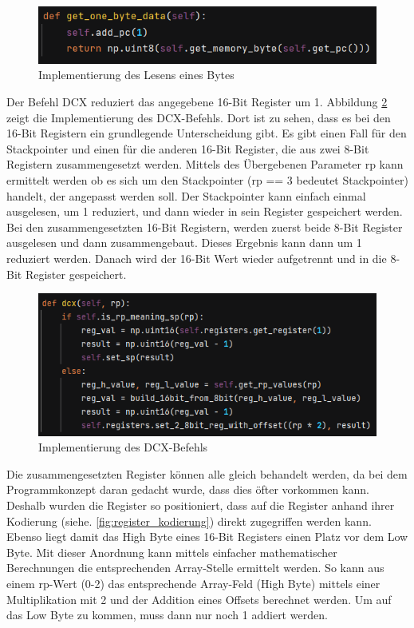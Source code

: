 \documentclass[12pt]{article}
\newcommand{\imgSpaceBefore}{\vspace{10pt}}
\begin{document}
\imgSpaceBefore
\begin{figure}[h]
\centering
\includegraphics[width=15cm]{Bilder/GetOneByteData}
\caption{Implementierung des Lesens eines Bytes}
\label{fig:GetOneByteData}
\end{figure}

\noindent
Der Befehl DCX reduziert das angegebene 16-Bit Register um 1. 
Abbildung \ref{fig:dcx_impl} zeigt die Implementierung des DCX-Befehls. 
Dort ist zu sehen, dass es bei den 16-Bit Registern ein grundlegende Unterscheidung gibt. Es gibt einen Fall für den Stackpointer und einen für die anderen 16-Bit Register, die aus zwei 8-Bit Registern zusammengesetzt werden. Mittels des Übergebenen Parameter rp kann ermittelt werden ob es sich um den Stackpointer (rp  == 3 bedeutet Stackpointer) handelt, der angepasst werden soll. 
Der Stackpointer kann einfach einmal ausgelesen, um 1 reduziert, und dann wieder in sein Register gespeichert werden.
Bei den zusammengesetzten 16-Bit Registern, werden zuerst beide 8-Bit Register ausgelesen und dann zusammengebaut. Dieses Ergebnis kann dann um 1 reduziert werden. Danach wird der 16-Bit Wert wieder aufgetrennt und in die 8-Bit Register gespeichert. 

\imgSpaceBefore
\begin{figure}[H]
\centering
\includegraphics[width=15cm]{Bilder/dcx_impl}
\caption{Implementierung des DCX-Befehls}
\label{fig:dcx_impl}
\end{figure}

\noindent
Die zusammengesetzten Register können alle gleich behandelt werden, da bei dem Programmkonzept daran gedacht wurde, dass dies öfter vorkommen kann. Deshalb wurden die Register so positioniert, dass auf die Register anhand ihrer Kodierung (siehe. \ref{fig:register_kodierung}) direkt zugegriffen werden kann. Ebenso liegt damit das High Byte eines 16-Bit Registers einen Platz vor dem Low Byte. Mit dieser Anordnung kann mittels einfacher mathematischer Berechnungen die entsprechenden Array-Stelle ermittelt werden. So kann aus einem rp-Wert (0-2) das entsprechende Array-Feld (High Byte) mittels einer Multiplikation mit 2 und der Addition eines Offsets berechnet werden. Um auf das Low Byte zu kommen, muss dann nur noch 1 addiert werden.
\end{document}
